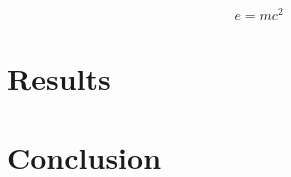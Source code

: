 \documentclass[twoside,twocolumn]{article}
\begin{document}
\blindtext %

\begin{equation}
\label{eq:emc}
e = mc^2
\end{equation}

\blindtext %


\section{Results}

\blindtext


\section{Conclusion}

\blindtext %

%
%

\nocite{*}



\end{document}
